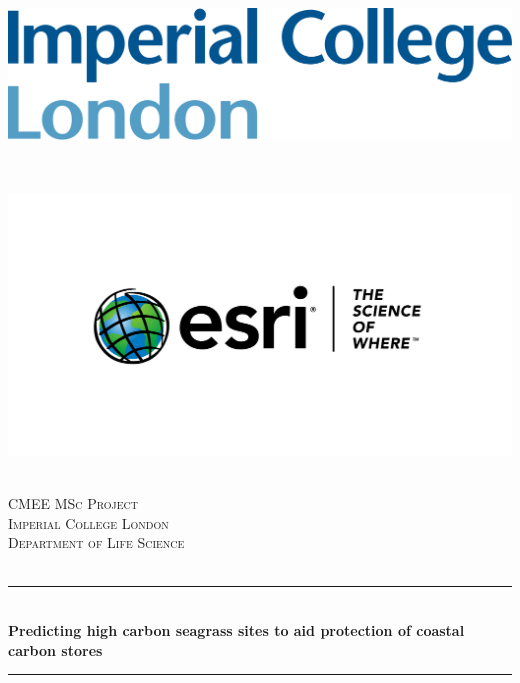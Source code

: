 \documentclass[a4paper]{report}
\begin{document}
\begin{titlepage}

\newcommand{\HRule}{\rule{\linewidth}{0.5mm}} 
\setlength{\topmargin}{0in}
\center 
 
 
 \begin{minipage}{0.4\textwidth}
\begin{flushleft} \large
\hspace*{-0.5cm}
\includegraphics[scale=0.14]{../data/imperial.png}\\
\end{flushleft}
\end{minipage}
~
\begin{minipage}{0.5\textwidth}
\begin{flushright} \large
\hspace*{2cm}
\includegraphics[scale=0.20]{../data/logo.jpg}\\
\end{flushright}
\end{minipage}\\[1cm]

\textsc{\LARGE CMEE MSc Project}\\[1.5cm] 
\textsc{\Large Imperial College London}\\[0.5cm] 
\textsc{\large Department of Life Science}\\[0.5cm] 


\textsc{\large }\\[0.5cm] 

\HRule \\[0.4cm]
{ \huge \bfseries Predicting high carbon seagrass sites to aid protection of coastal carbon stores}\\[0.4cm] %
\HRule \\[1cm]


\end{titlepage}
\end{document}
